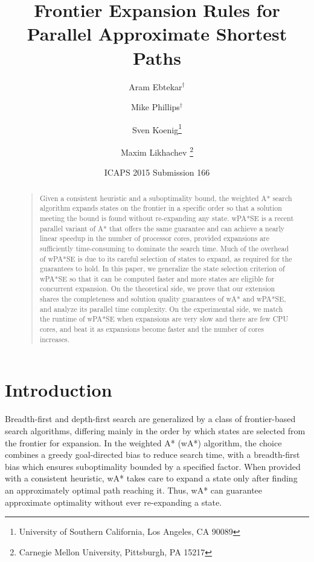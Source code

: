 \documentclass[letterpaper]{article}
\begin{document}
%
\title{Frontier Expansion Rules for Parallel Approximate Shortest Paths}
\author{Aram Ebtekar$^\dagger$ \and Mike Phillips$^\dagger$ \and Sven Koenig\thanks{University of Southern California, Los Angeles, CA 90089} \and Maxim Likhachev%
\thanks{Carnegie Mellon University, Pittsburgh, PA 15217}%
%
}
\author{ICAPS 2015 Submission 166}%
\maketitle
\begin{abstract}
\begin{quote}
Given a consistent heuristic and a suboptimality bound, the weighted A* search algorithm expands states on the frontier in a specific order so that a solution meeting the bound is found without re-expanding any state.
wPA*SE is a recent parallel variant of A* that offers the same guarantee and can achieve a nearly linear speedup in the number of processor cores, provided expansions are sufficiently time-consuming to dominate the search time.
Much of the overhead of wPA*SE is due to its careful selection of states to expand, as required for the guarantees to hold.
In this paper, we generalize the state selection criterion of wPA*SE so that it can be computed faster and more states are eligible for concurrent expansion.
On the theoretical side, we prove that our extension shares the completeness and solution quality guarantees of wA* and wPA*SE, and analyze its parallel time complexity.
On the experimental side, we match the runtime of wPA*SE when expansions are very slow and there are few CPU cores, and beat it as expansions become faster and the number of cores increases.
\end{quote}
\end{abstract}

\section{Introduction}

Breadth-first and depth-first search are generalized by a class of frontier-based search algorithms, differing mainly in the order by which states are selected from the frontier for expansion. In the weighted A* (wA*) algorithm, the choice combines a greedy goal-directed bias to reduce search time, with a breadth-first bias which ensures suboptimality bounded by a specified factor. When provided with a consistent heuristic, wA* takes care to expand a state only after finding an approximately optimal path reaching it. Thus, wA* can guarantee approximate optimality without ever re-expanding a state.
\end{document}
